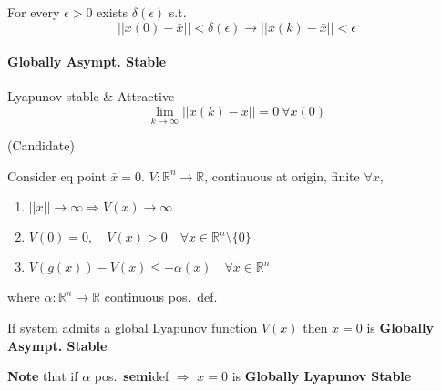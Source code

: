 
For every $\epsilon>0$ exists $\delta(\epsilon)$ s.t.\\
\noindent\begin{equation*}
    \lvert\lvert x(0) - \bar{x} \rvert\rvert < \delta(\epsilon) \to
    \lvert\lvert x(k) - \bar{x} \rvert\rvert < \epsilon
\end{equation*}

\paragraph{Globally Asympt. Stable}
Lyapunov stable \& Attractive
\noindent\begin{equation*}
    \lim_{k\to\infty} \lvert\lvert x(k) - \bar{x} \rvert\rvert = 0 \ \forall x(0)
\end{equation*}

\newpar{}
 (Candidate)

Consider eq point $\bar{x}=0$. $V:\mathbb{R}^n\to \mathbb{R}$, continuous at origin, finite $\forall x$,
\begin{enumerate}
    \item $\lvert\lvert x \rvert\rvert \to \infty \Rightarrow V(x) \to \infty$
    \item $V(0)=0, \quad V(x)>0 \quad \forall x \in \mathbb{R}^n \setminus\{0\}$
    \item $V(g(x)) - V(x) \leq -\alpha(x) \quad \forall x \in \mathbb{R}^n$
\end{enumerate}
where $\alpha:\mathbb{R}^n\to \mathbb{R}$ continuous pos.\ def.

\newpar{}

If system admits a global Lyapunov function $V(x)$ then $x=0$ is \textbf{Globally Asympt. Stable}

\newpar{}
\textbf{Note} that if $\alpha$ pos.\ \textbf{semi}def $\Rightarrow$ $x=0$ is \textbf{Globally Lyapunov Stable}